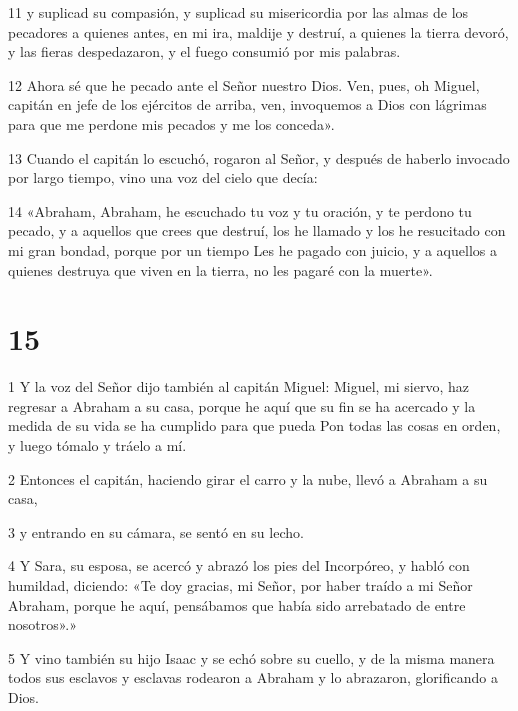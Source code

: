 \par 11 y suplicad su compasión, y suplicad su misericordia por las almas de los pecadores a quienes antes, en mi ira, maldije y destruí, a quienes la tierra devoró, y las fieras despedazaron, y el fuego consumió por mis palabras.

\par 12 Ahora sé que he pecado ante el Señor nuestro Dios. Ven, pues, oh Miguel, capitán en jefe de los ejércitos de arriba, ven, invoquemos a Dios con lágrimas para que me perdone mis pecados y me los conceda».

\par 13 Cuando el capitán lo escuchó, rogaron al Señor, y después de haberlo invocado por largo tiempo, vino una voz del cielo que decía:

\par 14 «Abraham, Abraham, he escuchado tu voz y tu oración, y te perdono tu pecado, y a aquellos que crees que destruí, los he llamado y los he resucitado con mi gran bondad, porque por un tiempo Les he pagado con juicio, y a aquellos a quienes destruya que viven en la tierra, no les pagaré con la muerte».

\chapter{15}

\par 1 Y la voz del Señor dijo también al capitán Miguel: Miguel, mi siervo, haz regresar a Abraham a su casa, porque he aquí que su fin se ha acercado y la medida de su vida se ha cumplido para que pueda Pon todas las cosas en orden, y luego tómalo y tráelo a mí.

\par 2 Entonces el capitán, haciendo girar el carro y la nube, llevó a Abraham a su casa,

\par 3 y entrando en su cámara, se sentó en su lecho.

\par 4 Y Sara, su esposa, se acercó y abrazó los pies del Incorpóreo, y habló con humildad, diciendo: «Te doy gracias, mi Señor, por haber traído a mi Señor Abraham, porque he aquí, pensábamos que había sido arrebatado de entre nosotros».»

\par 5 Y vino también su hijo Isaac y se echó sobre su cuello, y de la misma manera todos sus esclavos y esclavas rodearon a Abraham y lo abrazaron, glorificando a Dios.

